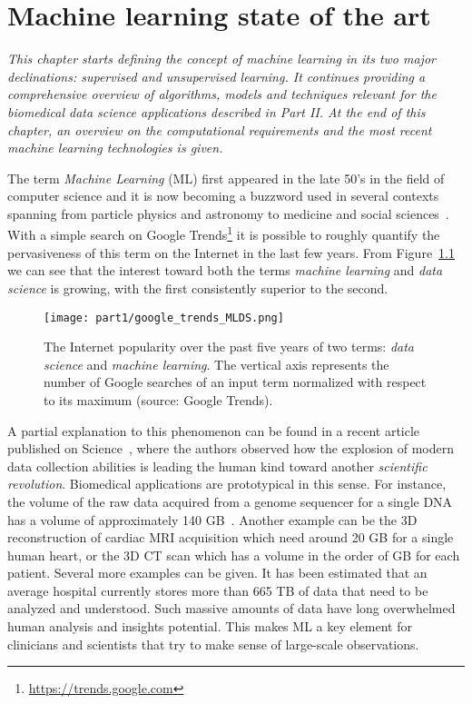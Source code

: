 
\chapter{Machine learning state of the art} \label{chap:state-of-the-art}

\begin{displayquote}
	\textit{This chapter starts defining the concept of machine learning in its two major declinations: supervised and unsupervised learning. It continues providing a comprehensive overview of algorithms, models and techniques relevant for the biomedical data science applications described in Part II. At the end of this chapter, an overview on the computational requirements and the most recent machine learning technologies is given.}
\end{displayquote}

The term \textit{Machine Learning} (ML) first appeared in the late 50's in the field of computer science and it is now becoming a buzzword used in several contexts spanning from particle physics and astronomy to medicine and social sciences~\cite{service2017ai}.
With a simple search on Google Trends\footnote{\url{https://trends.google.com}} it is possible to roughly quantify the pervasiveness of this term on the Internet in the last few years. From Figure~\ref{fig:google_trend_ML} we can see that the interest toward both the terms \textit{machine learning} and \textit{data science} is growing, with the first consistently superior to the second.

\begin{figure}[h!]
  \centering
    \texttt{[image: part1/google\_trends\_MLDS.png]}
  \caption{The Internet popularity over the past five years of two terms: \textit{data science} and \textit{machine learning}. The vertical axis represents the number of Google searches of an input term normalized with respect to its maximum (source: Google Trends).} \label{fig:google_trend_ML}
\end{figure}

A partial explanation to this phenomenon can be found in a recent article published on Science~\cite{appenzeller2017revolution}, where the authors observed how the explosion of modern data collection abilities is leading the human kind toward another \textit{scientific revolution}.
Biomedical applications are prototypical in this sense. For instance, the volume of the raw data acquired from a genome sequencer for a single \ac{DNA} has a volume of approximately 140 GB~\cite{marx2013biology}. Another example can be the 3D reconstruction of cardiac MRI acquisition which need around 20 GB for a single human heart, or the 3D \ac{CT} scan which has a volume in the order of GB for each patient. Several more examples can be given. It has been estimated that an average hospital currently stores more than 665 TB of data that need to be analyzed and understood.
Such massive amounts of data have long overwhelmed human analysis and insights potential. This makes ML a key element for clinicians and scientists that try to make sense of large-scale observations.

